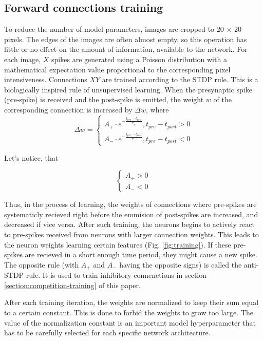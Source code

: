\documentclass[a4paper,10pt]{article}
\begin{document}
\subsection{Forward connections training}
To reduce the number of model parameters, images are cropped to 20 $\times$ 20 pixels. The edges of the images are often almost empty, so this operation has little or no effect on the amount of information, available to the network. For each image, $X$ spikes are generated using a Poisson distribution with a mathematical expectation value  proportional to the corresponding pixel intensiveness. Connections $XY$ are trained according to the STDP \cite{STDP} rule. This is a biologically inspired rule of unsupervised learning. When the presynaptic spike (pre-spike) is received and the post-spike is emitted, the weight $w$ of the corresponding connection is increased by $ \Delta w $, where
\begin{equation} 
\Delta w =
 \begin{cases}
 A_+ \cdot e^{- \frac{t_{pre} - t_{post}}{\tau_+}}, t_{pre} - t_{post} > 0\\
 A_- \cdot e^{- \frac{t_{pre} - t_{post}}{\tau_-}}, t_{pre} - t_{post} < 0
 \end{cases}
\end{equation}

Let's notice, that

$$
\begin{cases}
 A_{+} > 0\\
 A_{-} < 0
\end{cases}
$$

Thus, in the process of learning, the weights of connections where pre-spikes are systematicly recieved right before the emmision of post-spikes are increased, and decreased if vice versa. After such training, the neurons begins to actively react to pre-spikes received from neurons with larger connection weights. This leads to the neuron weights learning certain features (Fig. \ref{fig:training}). If these pre-spikes are recieved in a short enough time period, they might cause a new spike. The opposite rule (with $A_{+}$ and $A_{-}$ having the opposite signs) is called the anti-STDP \cite{anti-STDP} rule. It is used to train inhibitory connenctions in section \ref{section:competition-training} of this paper.

After each training iteration, the weights are normalized to keep their sum equal to a certain constant. This is done to forbid the weights to grow too large. The value of the normalization constant is an important model hyperparameter that has to be carefully selected for each specific network architecture.
\end{document}
